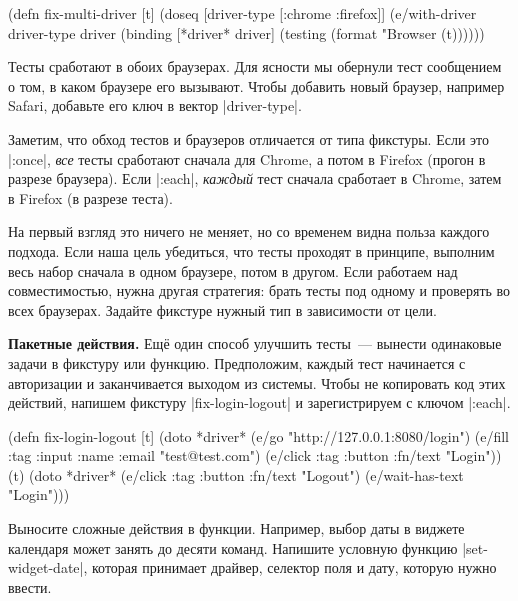\begin{english}
  \begin{clojure}
(defn fix-multi-driver [t]
  (doseq [driver-type [:chrome :firefox]]
    (e/with-driver driver-type {} driver
      (binding [*driver* driver]
        (testing (format "Browser %
          (t))))))
  \end{clojure}
\end{english}

Тесты сработают в обоих браузерах. Для ясности мы обернули тест сообщением о
том, в каком браузере его вызывают. Чтобы добавить новый браузер, например
Safari, добавьте его ключ в вектор \spverb|driver-type|.


Заметим, что обход тестов и браузеров отличается от типа фикстуры. Если это
\spverb|:once|, \emph{все} тесты сработают сначала для Chrome, а потом в Firefox
(прогон в разрезе браузера). Если \spverb|:each|, \emph{каждый} тест сначала
сработает в Chrome, затем в Firefox (в разрезе теста).

На первый взгляд это ничего не меняет, но со временем видна польза каждого
подхода. Если наша цель убедиться, что тесты проходят в принципе, выполним весь
набор сначала в одном браузере, потом в другом. Если работаем над
совместимостью, нужна другая стратегия: брать тесты под одному и проверять во
всех браузерах. Задайте фикстуре нужный тип в зависимости от цели.

\textbf{Пакетные действия.} Ещё один способ улучшить тесты~--- вынести
одинаковые задачи в фикстуру или функцию. Предположим, каждый тест начинается с
авторизации и заканчивается выходом из системы. Чтобы не копировать код этих
действий, напишем фикстуру \spverb|fix-login-logout| и зарегистрируем с ключом
\spverb|:each|.

\begin{english}
  \begin{clojure}
(defn fix-login-logout [t]
  (doto *driver*
    (e/go "http://127.0.0.1:8080/login")
    (e/fill {:tag :input :name :email} "test@test.com")
    (e/click {:tag :button :fn/text "Login"}))
  (t)
  (doto *driver*
    (e/click {:tag :button :fn/text "Logout"})
    (e/wait-has-text "Login")))
  \end{clojure}
\end{english}

Выносите сложные действия в функции. Например, выбор даты в виджете календаря
может занять до десяти команд. Напишите условную функцию
\spverb|set-widget-date|, которая принимает драйвер, селектор поля и дату,
которую нужно ввести.

